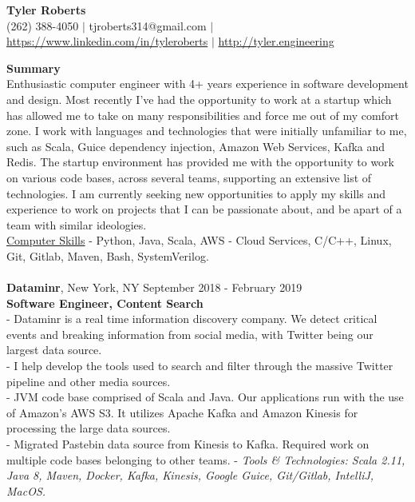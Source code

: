 \documentclass{resume}
\begin{document}
\begin{center}
{\LARGE \bf Tyler Roberts} \\[1mm]
\footnotesize
(262) 388-4050 $|$
tjroberts314@gmail.com $|$
\href{https://www.linkedin.com/in/tyleroberts}{https://www.linkedin.com/in/tyleroberts} $|$
\href{http://tyler.engineering}{http://tyler.engineering}
\end{center}
\begin{flushleft}

{\textbf{\large Summary}} \\
{
\footnotesize
\tab Enthusiastic computer engineer with 4+ years experience in software development and design. Most recently I've had the opportunity to work at a startup which has allowed me to take on many responsibilities and force me out of my comfort zone. I work with languages and technologies that were initially unfamiliar to me, such as Scala, Guice dependency injection, Amazon Web Services, Kafka and Redis. The startup environment has provided me with the opportunity to work on various code bases, across several teams, supporting an extensive list of technologies. I am currently seeking new opportunities to apply my skills and experience to work on projects that I can be passionate about, and be apart of a team with similar ideologies. \\[2mm]

}
\underline{Computer Skills} - Python, Java, Scala, AWS - Cloud Services, C/C++, Linux, Git, Gitlab, Maven, Bash, \hspace*{31.8mm} SystemVerilog. \\[5mm]
\\[2mm]

\textbf{Dataminr}, New York, NY \hfill September 2018 - February 2019\\
\textbf{Software Engineer, Content Search}\\
{\footnotesize
\ttab - Dataminr is a real time information discovery company. We detect critical events and breaking information from social \ttab media, with Twitter being our largest data source. \\
\ttab - I help develop the tools used to search and filter through the massive Twitter pipeline and other media sources. \\
\ttab - JVM code base comprised of Scala and Java. Our applications run with the use of Amazon's AWS S3. It utilizes Apache \ttab Kafka and Amazon Kinesis for processing the large data sources.\\
\ttab - Migrated Pastebin data source from Kinesis to Kafka. Required work on multiple code bases belonging to other teams.
\ttab- \textit{Tools \& Technologies: Scala 2.11, Java 8, Maven, Docker, Kafka, Kinesis, Google Guice, Git/Gitlab, IntelliJ, MacOS.}\\[3mm]
}


\end{flushleft}
\end{document}
